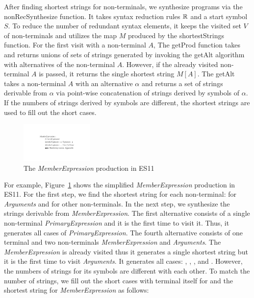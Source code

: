 After finding shortest strings for non-terminals, we synthesize programs via the
\textsf{nonRecSynthesize} function.  It takes syntax reduction rules $\mathbb{R}$
and a start symbol $S$.  To reduce the number of redundant syntax elements, it
keeps the visited set $V$ of non-terminals and utilizes the map $M$ produced by
the \textsf{shortestStrings} function.  For the first visit with a non-terminal
$A$, The \textsf{getProd} function takes and returns unions of sets of strings
generated by invoking the \textsf{getAlt} algorithm with alternatives of the
non-terminal $A$.  However, if the already visited non-terminal $A$ is passed,
it returns the single shortest string $M[A]$.  The \textsf{getAlt} takes a
non-terminal $A$ with an alternative $\alpha$ and returns a set of strings
derivable from $\alpha$ via point-wise concatenation of strings derived by
symbols of $\alpha$.  If the numbers of strings derived by symbols are
different, the shortest strings are used to fill out the short cases.

\begin{figure}[t]
  \centering
  \includegraphics[width=0.32\textwidth]{img/syntax-member.pdf}
  \caption{The \textit{MemberExpression} production in ES11}
  \label{fig:prod-example}
  \vspace*{-1em}
\end{figure}

For example, Figure~\ref{fig:prod-example} shows the simplified
\textit{MemberExpression} production in ES11.  For the first step, we find
the shortest string for each non-terminal: \code{()} for \textit{Arguments} and
 for other non-terminals.  In the next step, we synthesize the strings
derivable from \textit{MemberExpression}.  The first alternative consists of a
single non-terminal \textit{PrimaryExpression} and it is the first time to visit
it.  Thus, it generates all cases of \textit{PrimaryExpression}.  The fourth
alternative consists of one terminal  and two non-terminals
\textit{MemberExpression} and \textit{Arguments}.  The \textit{MemberExpression}
is already visited thus it generates a single shortest string  but it is
the first time to visit \textit{Arguments}.  It generates all cases: \code{()},
, , and .  However, the numbers of strings for
its symbols are different with each other.  To match the number of strings, we
fill out the short cases with terminal itself for  and the shortest
string  for \textit{MemberExpression} as follows:

